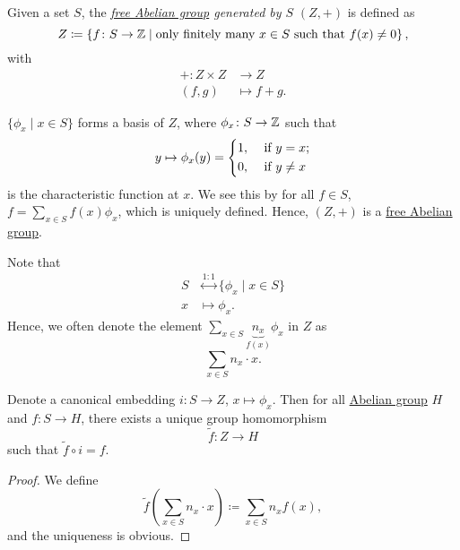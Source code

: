 \begin{definition}\label{def:free-Abelian-group-generated-by-sets}
	Given a set \(S\), the \emph{\hyperref[def:free-Abelian-group]{free Abelian group} generated by \(S\)} \((Z, +)\) is defined as
	\[
		Z\coloneqq \left\{f\colon S\to \mathbb{\MakeUppercase{z}} \mid \text{only finitely many \(x\in S\) such that \(f(x)\neq 0\)}\right\},
	\]
	with
	\[
		\begin{split}
			+\colon Z\times Z&\to Z\\
			(f, g)&\mapsto f + g.
		\end{split}
	\]
\end{definition}

\begin{remark}
	\(\{\phi _{x} \mid x\in S\}\) forms a basis of \(Z\), where \(\phi _{x} \colon S\to \mathbb{\MakeUppercase{z}} \) such that
	\[
		y\mapsto \phi _{x} (y) = \begin{dcases}
			1, & \text{ if } y=x ;    \\
			0, & \text{ if } y \neq x
		\end{dcases}
	\]
	is the characteristic function at \(x\). We see this by for all \(f\in S\), \(f = \sum\limits_{x\in S}^{} f(x)\phi _{x} \), which is uniquely defined. Hence, \((Z, +)\) is a \hyperref[def:free-Abelian-group]{free Abelian group}.
\end{remark}

\begin{note}
	Note that
	\[
		\begin{split}
			S &\overset{1:1}{\longleftrightarrow} \{\phi _{x} \mid x\in S\}\\
			x &\mapsto \phi _{x}.
		\end{split}
	\]
	Hence, we often denote the element \(\sum\limits_{x\in S}^{} \underbrace{n_{x}}_{f(x)} \phi _{x} \) in \(Z\) as
	\[
		\sum\limits_{x\in S}n_{x} \cdot x.
	\]
\end{note}
\begin{theorem}\label{thm:universal-property-of-free-Abelian-group-generated-by-a-set}
	Denote a canonical embedding \(i\colon S\to Z\), \(x\mapsto \phi _{x} \). Then for all \hyperref[def:Abelian-group]{Abelian group} \(H\) and \(f\colon S\to H\), there exists a unique group homomorphism
	\[
		\widetilde{f} \colon Z\to H
	\]
	such that \(\widetilde{f} \circ i = f\).
\end{theorem}
\begin{proof}
	We define
	\[
		\widetilde{f} \left(\sum\limits_{x\in S}^{} n_{x} \cdot x\right)\coloneqq \sum\limits_{x\in S}n_{x} f(x),
	\]
	and the uniqueness is obvious.
\end{proof}

